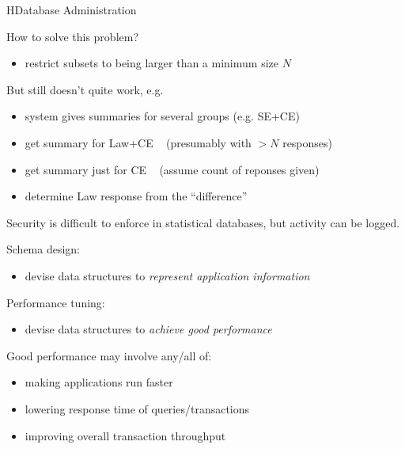 \begin{lecture}{H}{Database Administration}
\begin{slide}
How to solve this problem?
\begin{itemize}
\item restrict subsets to being larger than a minimum size $N$
\end{itemize}
But still doesn't quite work, e.g.
\begin{itemize}
\item system gives summaries for several groups (e.g. SE+CE)
\item get summary for Law+CE ~ {\small (presumably with $>N$ responses)}
\item get summary just for CE ~ {\small (assume count of reponses given)}
\item determine Law response from the ``difference''
\end{itemize}
{\small 
Security is difficult to enforce in statistical databases, but activity can be logged.
}
\end{slide}

\begin{slide}
\end{slide}

\begin{slide}
Schema design:
\begin{itemize}
\item devise data structures to {\em{represent application information}}
\end{itemize}
Performance tuning:
\begin{itemize}
\item devise data structures to {\em{achieve good performance}}
\end{itemize}
Good performance may involve any/all of:
\begin{itemize}
\vspace{-1ex}\item making applications run faster
\vspace{-1ex}\item lowering response time of queries/transactions
\vspace{-1ex}\item improving overall transaction throughput
\end{itemize}
\end{slide}


\end{lecture}
